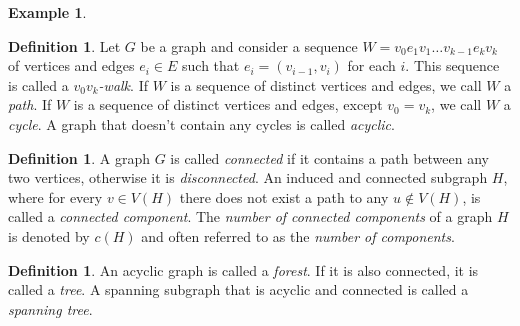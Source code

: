 \documentclass[12pt,a4paper, twoside, autooneside=false]{scrartcl}
\theoremstyle{definition}
\newtheorem{definition}[theorem]{Definition}
\newtheorem{beispiel}[theorem]{Example}
\theoremstyle{remark}
\numberwithin{equation}{section}
\begin{document}
\begin{beispiel}
\begin{center}
\label{fig:label}
\end{center}
\end{beispiel}
\begin{definition}
Let $G$ be a graph and consider a sequence $W = v_0e_1v_1\dots v_{k-1}e_kv_k$ of vertices and edges $e_i \in E$ such that $e_i = (v_{i-1}, v_i)$ for each $i$. This sequence is called a \textit{$v_0v_k$-walk}. If $W$ is a sequence of distinct vertices and edges, we call $W$ a \textit{path}. If $W$ is a sequence of distinct vertices and edges, except $v_0 = v_k$, we call $W$ a \textit{cycle}. A graph that doesn't contain any cycles is called \textit{acyclic}.
\end{definition}
\begin{definition}
A graph $G$ is called \textit{connected} if it contains a path between any two vertices, otherwise it is \textit{disconnected}. An induced and connected subgraph $H$, where for every $v \in V(H)$ there does not exist a path to any $u \not \in V(H)$, is called a \textit{connected component}. The \textit{number of connected components} of a graph $H$ is denoted by $c(H)$ and often referred to as the \textit{number of components}.
\end{definition}
\begin{definition}
An acyclic graph is called a \textit{forest}. If it is also connected, it is called a \textit{tree}. A spanning subgraph that is acyclic and connected is called a \textit{spanning tree}.
\end{definition}
\end{document}
